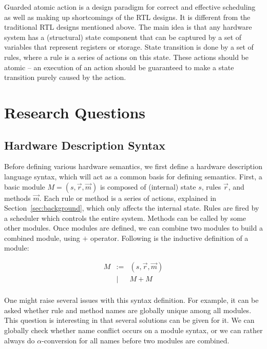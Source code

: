 Guarded atomic action is a design paradigm for correct and effective
scheduling as well as making up shortcomings of the RTL designs. It is
different from the traditional RTL designs mentioned above. The main
idea is that any hardware system has a (structural) state component
that can be captured by a set of variables that represent registers or
storage. State transition is done by a set of rules, where a rule is a
series of actions on this state. These actions should be atomic -- an
execution of an action should be guaranteed to make a state transition
purely caused by the action.

\section{Research Questions}

\subsection{Hardware Description Syntax}

\newcommand{\Mod}{\ensuremath{M}}
\newcommand{\ModC}[3]{\ensuremath{(#1, #2, #3)}}
\newcommand{\ModP}{\ensuremath{+}}
\newcommand{\Sem}[1]{\ensuremath{\llbracket #1 \rrbracket}}

Before defining various hardware semantics, we first define a hardware
description language syntax, which will act as a common basis for
defining semantics. First, a basic module $\Mod{} =
\ModC{s}{\vec{r}}{\vec{m}}$ is composed of (internal) state $s$, rules
$\vec{r}$, and methods $\vec{m}$. Each rule or method is a series of
actions, explained in Section~\ref{sec:background}, which only affects
the internal state. Rules are fired by a scheduler which controls the
entire system. Methods can be called by some other modules. Once
modules are defined, we can combine two modules to build a combined
module, using \ModP{} operator. Following is the inductive definition
of a module:

$$\begin{array}{rcl}
  \Mod{} & := & \ModC{s}{\vec{r}}{\vec{m}} \\
  & | & \Mod{} \ModP{} \Mod{} \\
\end{array}$$

One might raise several issues with this syntax definition. For
example, it can be asked whether rule and method names are globally
unique among all modules. This question is interesting in that several
solutions can be given for it. We can globally check whether name
conflict occurs on a module syntax, or we can rather always do
$\alpha$-conversion for all names before two modules are combined.

